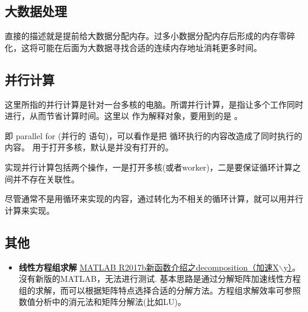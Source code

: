 \subsection{大数据处理}

直接的描述就是提前给大数据分配内存。过多小数据分配内存后形成的内存零碎化，这将可能在后面为大数据寻找合适的连续内存地址消耗更多时间。





\subsection{并行计算}

这里所指的并行计算是针对一台多核的电脑。所谓并行计算，是指让多个工作同时进行，从而节省计算时间。这里以  作为解释对象，要用到的是 。\par

 即 parallel for (并行的  语句)，可以看作是把  循环执行的内容改造成了同时执行的内容。  用于打开多核，默认是并没有打开的。\par

实现并行计算包括两个操作，一是打开多核(或者worker)，二是要保证循环计算之间并不存在关联性。

\vspace{-0.8cm}


\vspace{-0.8cm}


尽管通常不是用循环来实现的内容，通过转化为不相关的循环计算，就可以用并行计算来实现。















\subsection{其他}

\begin{itemize}
    \item \textbf{线性方程组求解} \href{https://zhuanlan.zhihu.com/p/30958676}{MATLAB R2017b新函数介绍之decomposition（加速X$\backslash$y）}。沒有新版的MATLAB，无法进行测试. 基本思路是通过分解矩阵加速线性方程组的求解，而可以根据矩阵特点选择合适的分解方法。方程组求解效率可参照数值分析中的消元法和矩阵分解法(比如LU)。
\end{itemize}